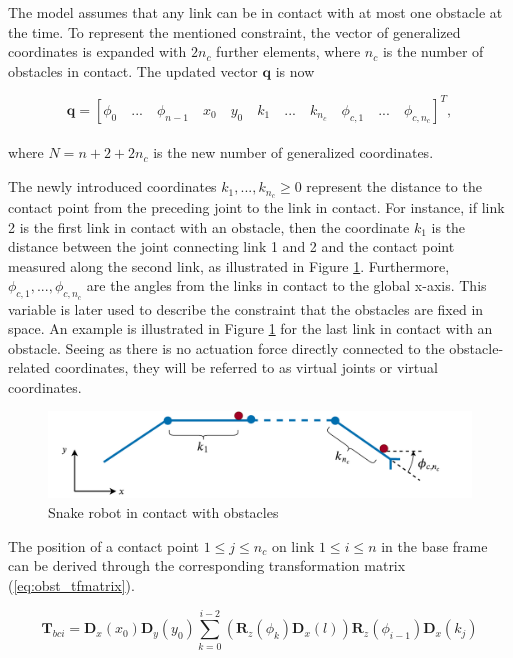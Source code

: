 The model assumes that any link can be in contact with at most one obstacle at the time. To represent the mentioned constraint, the vector of generalized coordinates is expanded with $2n_c$ further elements, where $n_c$ is the number of obstacles in contact. The updated vector $\mathbf{q}$ is now

\begin{equation} \label{eq:q2}
    \mathbf{q} = 
    [
        \phi_0 \quad... \quad \phi_{n-1} \quad x_0 \quad y_0 \quad k_{1} \quad ... \quad k_{n_c} \quad \phi_{c,1} \quad ... \quad \phi_{c,n_c}
    ]^T,
\end{equation}
\\
where $N = n + 2 + 2n_c$ is the new number of generalized coordinates.

The newly introduced coordinates $k_{1}, ... , k_{n_c} \geq 0$ represent the distance to the contact point from the preceding joint to the link in contact. For instance, if link 2 is the first link in contact with an obstacle, then the coordinate $k_{1}$ is the distance between the joint connecting link 1 and 2 and the contact point measured along the second link, as illustrated in Figure \ref{fig:obst-coords}. Furthermore, $\phi_{c,1}, ... , \phi_{c,n_c}$ are the angles from the links in contact to the global x-axis. This variable is later used to describe the constraint that the obstacles are fixed in space. An example is illustrated in Figure \ref{fig:obst-coords} for the last link in contact with an obstacle.
Seeing as there is no actuation force directly connected to the obstacle-related coordinates, they will be referred to as virtual joints or virtual coordinates.

\begin{figure}\label{fig:obst-coords}
    \centering
    \includegraphics[width=\textwidth]{figures/theory/obst-coords.pdf}
    \caption{Snake robot in contact with obstacles}
    \label{fig:obst-coords}
\end{figure}

The position of a contact point $1\leq j\leq n_c$ on link $1\leq i\leq n$ in the base frame can be derived through the corresponding transformation matrix (\ref{eq:obst_tfmatrix}).

\begin{equation} \label{eq:obst_tfmatrix}
    \textbf{T}_{b ci} = \textbf{D}_x(x_0) \textbf{D}_y(y_0) \sum_{k=0}^{i-2} (\textbf{R}_z(\phi_k) \textbf{D}_x(l)) \textbf{R}_z(\phi_{i-1}) \textbf{D}_x(k_{j})
\end{equation}


